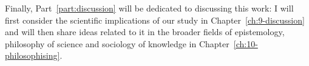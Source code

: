 Finally, Part~\ref{part:discussion} will be dedicated to discussing this work: I will first consider the scientific implications of our study in Chapter~\ref{ch:9-discussion} and will then share ideas related to it in the broader fields of epistemology, philosophy of science and sociology of knowledge in Chapter~\ref{ch:10-philosophising}.










